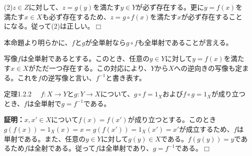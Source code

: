\documentclass[dvipdfmx, 9pt, a4paper]{jsarticle}
\numberwithin{equation}{subsection}
\def\qed{\hfill $\Box$}
\begin{document}
(2)$z \in Z$に対して、$z=g(y)$を満たす$y \in Y$が必ず存在する。更に$y=f(x)$を満たす$x \in X$も必ず存在するため、$z=g \circ f(x)$を満たす$x$が必ず存在することになる。従って(2)は正しい。\qed \par
本命題より明らかに、$f$と$g$が全単射なら$g \circ f$も全単射であることが言える。\par
写像$f$は全単射であるとする。このとき、任意の$y \in Y$に対して$y=f(x)$を満たす$x \in X$がただ一つ存在する。この対応により、$Y$から$X$への逆向きの写像も定まる。これを$f$の逆写像と言い、$f^{-1}$と書き表す。
\begin{itembox}[l]{定理1.2.2}
　$f:X \to Y$と$g: Y \to X$について、$g \circ f=1_X$および$f \circ g=1_X$が成り立つとき、$f$は全単射で$g=f^{-1}$である。
\end{itembox}
{\bf 証明：}$x, x' \in X$について$f(x)=f(x')$が成り立つとする。このとき$g(f(x))=1_X(x)=x=g(f(x'))=1_X(x')=x'$が成立するため、$f$は単射である。また、任意の$y \in Y$に対して$g(y) \in X$である。$f(g(y))=y$であるため$f$は全射である。従って$f$は全単射であり、$g=f^{-1}$である。\qed
\end{document}

